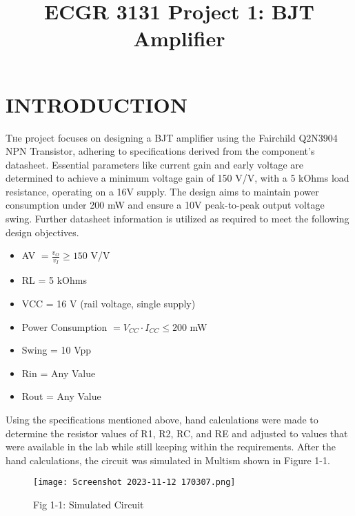 \documentclass[conference]{IEEEtran}
\begin{document}
\title{\textbf{ECGR 3131 Project 1: BJT Amplifier}}

\author{
}

\maketitle
\section{INTRODUCTION}
\lettrine[nindent=0em,lines=3]{T}he project focuses on designing a BJT amplifier using the Fairchild Q2N3904 NPN Transistor, adhering to specifications derived from the component's datasheet. Essential parameters like current gain and early voltage are determined to achieve a minimum voltage gain of 150 V/V, with a 5 kOhms load resistance, operating on a 16V supply. The design aims to maintain power consumption under 200 mW and ensure a 10V peak-to-peak output voltage swing. Further datasheet information is utilized as required to meet the following design objectives.

\begin{itemize}
    \item AV \( = \frac{v_O}{v_I} \geq 150 \) V/V
    \item RL = 5 kOhms
    \item VCC = 16 V (rail voltage, single supply)
    \item Power Consumption \( = V_{CC} \cdot I_{CC} \leq 200 \) mW
    \item Swing = 10 Vpp 
    \item Rin = Any Value
    \item Rout = Any Value
\end{itemize}
\par
\vspace{12pt} %
Using the specifications mentioned above, hand calculations were made to determine the resistor values of R1, R2, RC, and RE and adjusted to values that were available in the lab while still keeping within the requirements. After the hand calculations, the circuit was simulated in Multism shown in Figure 1-1.
\begin{figure}[htbp]
    \centering
    \texttt{[image: Screenshot 2023-11-12 170307.png]}
    \caption{Fig 1-1: Simulated Circuit}
    \label{fig:simulated-circuit}
\end{figure}
\end{document}
